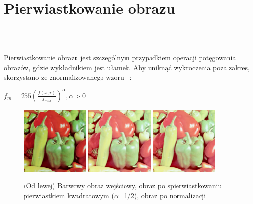\documentclass[final,a4paper,openany,12pt]{mwbk}
\begin{document}
\section{ Pierwiastkowanie obrazu}

\hfill
\\\\
\indent

\begin{center} Pierwiastkowanie obrazu jest szczególnym przypadkiem operacji potęgowania obrazów, gdzie wykładnikiem jest ułamek. Aby uniknąć wykroczenia poza zakres, skorzystano ze znormalizowanego wzoru ~\cite{WykRat}:

		$f_{m} = 255(\frac{f(x,y)}{f_{max}}) ^{\alpha}, \alpha > 0 $
	\end{center}
	

\begin{figure}[H]
	\begin{center}
		\includegraphics[width=0.3\textwidth]{1/1Color_Sqrt_Original}
		\includegraphics[width=0.3\textwidth]{1/1Color_Sqrt_Result}
		\includegraphics[width=0.3\textwidth]{1/1Color_Sqrt_Result_Norm}
	\end{center}
	\caption{(Od lewej) Barwowy obraz wejściowy, obraz po spierwiastkowaniu pierwiastkiem kwadratowym ($\alpha$=1/2), obraz po normalizacji }
\end{figure}
\end{document}
